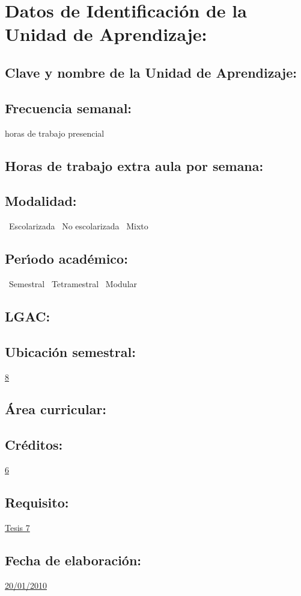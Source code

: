 \documentclass[10 pt]{article}
\begin{document}


\section{Datos de Identificaci\'{o}n de la Unidad de Aprendizaje:}
\subsection{Clave y nombre de la Unidad de Aprendizaje:} 
\subsection{Frecuencia semanal:} horas de trabajo presencial 
\subsection{Horas de trabajo extra aula por semana:} 
\subsection{Modalidad:} \yes~Escolarizada \no~No escolarizada \no~Mixto
\subsection{Per\'{\i}odo acad\'{e}mico:} \yes~Semestral
\no~Tetramestral \no~Modular
\subsection{LGAC:} \underline{\odsi}
\subsection{Ubicaci\'{o}n semestral:} \underline{8}
\subsection{\'{A}rea curricular:} \underline{\pi}
\subsection{Cr\'{e}ditos:} \underline{6}
\subsection{Requisito:} \underline{Tesis 7}
\subsection{Fecha de elaboraci\'{o}n:} \underline{20/01/2010}
\end{document}
